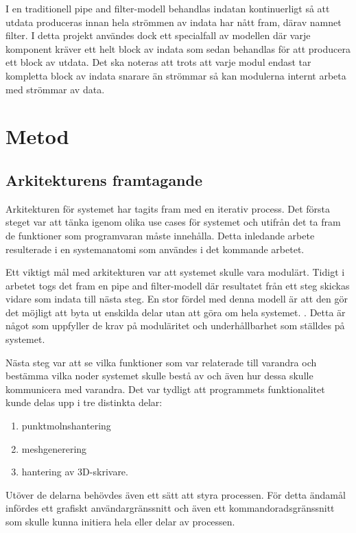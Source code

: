 I en traditionell pipe and filter-modell behandlas indatan kontinuerligt så att utdata produceras innan hela strömmen av indata har nått fram, därav namnet filter. I detta projekt användes dock ett specialfall av modellen där varje komponent kräver ett helt block av indata som sedan behandlas för att producera ett block av utdata. Det ska noteras att trots att varje modul endast tar kompletta block av indata snarare än strömmar så kan modulerna internt arbeta med strömmar av data.


\section{Metod}
\label{sec:method-lundberg}

\subsection{Arkitekturens framtagande}
Arkitekturen för systemet har tagits fram med en iterativ process. Det första steget var att tänka igenom olika use cases för systemet och utifrån det ta fram de funktioner som programvaran måste innehålla. Detta inledande arbete resulterade i en systemanatomi som användes i det kommande arbetet.

Ett viktigt mål med arkitekturen var att systemet skulle vara modulärt. Tidigt i arbetet togs det fram en pipe and filter-modell där resultatet från ett steg skickas vidare som indata till nästa steg. En stor fördel med denna modell är att den gör det möjligt att byta ut enskilda delar utan att göra om hela systemet. \cite{garlan1993introduction}. Detta är något som uppfyller de krav på moduläritet och underhållbarhet som ställdes på systemet.

Nästa steg var att se vilka funktioner som var relaterade till varandra och bestämma vilka noder systemet skulle bestå av och även hur dessa skulle kommunicera med varandra. Det var tydligt att programmets funktionalitet kunde delas upp i tre distinkta delar:

\begin{enumerate}
	\item punktmolnshantering
	
	\item meshgenerering
	
	\item hantering av 3D-skrivare.
\end{enumerate}

Utöver de delarna behövdes även ett sätt att styra processen. För detta ändamål infördes ett grafiskt användargränssnitt och även ett kommandoradsgränssnitt som skulle kunna initiera hela eller delar av processen.

